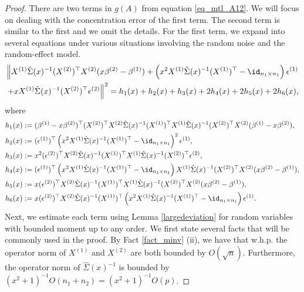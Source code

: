 \documentclass[aos,preprint]{imsart}
\begin{document}
\begin{proof}
 There are two terms in $g(A)$ from equation \eqref{eq_mtl_A12}.
 We will focus on dealing with the concentration error of the first term. The second term is similar to the first and we omit the details.
 For the first term, we expand into several equations under various situations involving the random noise and the random-effect model.
 \begin{align}
 & \left\| X^{(1)} \hat\Sigma(x)^{-1} (X^{(2)})^\top X^{(2)} (x\beta^{(2)}-\beta^{(1)})+ \left(x^2 X^{(1)}\hat \Sigma(x)^{-1} (X^{(1)})^\top-\id_{n_1\times n_1}\right)\epsilon^{(1)} \right. \nonumber\\
		& \left. + x X^{(1)}\hat \Sigma(x)^{-1} (X^{(2)})^\top \epsilon^{(2)} \right\|^2=h_1(x) + h_2(x) +h_3(x) + 2h_4(x) + 2h_5(x) + 2h_6(x), \label{expand_6}
 \end{align}
 where
 \begin{align*}
&h_1(x):=  (\beta^{(1)}-x\beta^{(2)})^\top (X^{(2)})^\top X^{(2)}  \hat\Sigma(x)^{-1}  (X^{(1)})^\top X^{(1)} \hat\Sigma(x)^{-1} (X^{(2)})^\top X^{(2)} (\beta^{(1)}-x\beta^{(2)})  ,\\
& h_2(x) := {(\epsilon^{(1)})^\top \left(x^2 X^{(1)}\hat\Sigma(x)^{-1} (X^{(1)})^\top-\id_{n_1\times n_1}\right)^2\epsilon^{(1)}}  ,\\
& h_3(x):=  x^2 { (\epsilon^{(2)} )^\top X^{(2)} \hat\Sigma(x)^{-1}  (X^{(1)})^\top X^{(1)}\hat\Sigma(x)^{-1} (X^{(2)})^\top \epsilon^{(2)}} , \\
& h_4(x):=  (\epsilon^{(1)})^\top\left(x^2 X^{(1)}\hat\Sigma(x)^{-1} (X^{(1)})^\top-\id_{n_1\times n_1}\right) X^{(1)} \hat\Sigma(x)^{-1} (X^{(2)})^\top X^{(2)} (x\beta^{(2)}-\beta^{(1)}), \\
&h_5(x):=x (\epsilon^{(2)})^\top X^{(2)}\hat\Sigma(x)^{-1} (X^{(1)})^\top X^{(1)} \hat\Sigma(x)^{-1} (X^{(2)})^\top X^{(2)} (x\beta^{(2)}-\beta^{(1)}),\\
&h_6(x):=x (\epsilon^{(2)})^\top X^{(2)}\hat\Sigma(x)^{-1} (X^{(1)})^\top\left(x^2 X^{(1)}\hat\Sigma(x)^{-1} (X^{(1)})^\top-\id_{n_1\times n_1}\right)\epsilon^{(1)}.
\end{align*}
Next, we estimate each term using Lemma \ref{largedeviation} for random variables with bounded moment up to any order.
We first state several facts that will be commonly used in the proof.
By Fact \ref{fact_minv} (ii), we have that w.h.p. the operator norm of $X^{(1)}$ and $X^{(2)}$ are both bounded by $O(\sqrt{n})$.
Furthermore, the operator norm of $\hat\Sigma(x)^{-1}$ is bounded by $(x^2 + 1)^{-1} O(n_1 + n_2) = (x^2 + 1)^{-1} O(p)$.


\end{proof}
\end{document}
